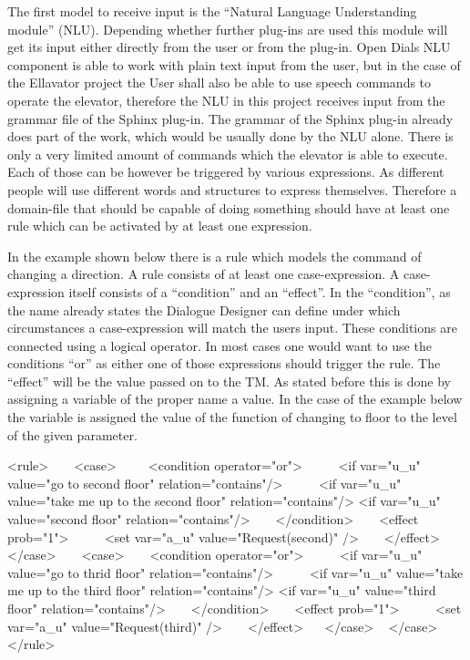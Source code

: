 The first model to receive input is the “Natural Language Understanding module” (NLU). 
Depending whether further plug-ins are used this module will get its input either directly from the user or from the plug-in.
Open Dials NLU component is able to work with plain text input from the user, but in the case of the Ellavator project the User shall also be able to use speech commands to operate the elevator, therefore the NLU in this project receives input from the grammar file of the Sphinx plug-in.
The grammar of the Sphinx plug-in already does part of the work, which would be usually done by the NLU alone.
There is only a very limited amount of commands which the elevator is able to execute.
Each of those can be however be triggered by various expressions. As different people will use different words and structures to express themselves.
Therefore a domain-file that should be capable of doing something should have at least one rule which can be activated by at least one expression.

In the example shown below there is a rule which models the command of changing a direction.
A rule consists of at least one case-expression.
A case-expression itself consists of a “condition” and an “effect”.
 In the “condition”, as the name already states the Dialogue Designer can define under which circumstances a case-expression will match the users input.
These conditions are connected using a logical operator.
In most cases one would want to use the conditions “or” as either one of those expressions should trigger the rule.
 The “effect” will be the value passed on to the TM.
As stated before this is done by assigning a variable of the proper name a value.
In the case of the example below the variable is assigned the value of the function of changing to floor to the level of the given parameter. 

<rule>
    <case>
     <condition operator="or">
      <if var="u_u" value="go to second floor" relation="contains"/>
      <if var="u_u" value="take me up to the second floor" relation="contains"/>
	<if var="u_u" value="second floor" relation="contains"/>
     </condition>
     <effect prob="1">
      <set var="a_u" value="Request(second)" />
     </effect>
    </case>
    <case>
     <condition operator="or">
      <if var="u_u" value="go to thrid floor" relation="contains"/>
      <if var="u_u" value="take me up to the third floor" relation="contains"/>
	<if var="u_u" value="third floor" relation="contains"/>
     </condition>
     <effect prob="1">
      <set var="a_u" value="Request(third)" />
     </effect>
   </case>
   </case>
  </rule>

